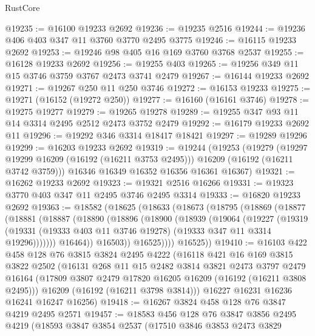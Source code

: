 \begin{lexlean}{RustCore}
\begin{coremodule}
@19235 := @16100 @19233 @2692
@19236 := @19235 @2516
@19244 := @19236 @406 @403 @347 @11 @3760 @3770 @2495 @3775
@19246 := @16115 @19233 @2692
@19253 := @19246 @98 @405 @16 @169 @3760 @3768 @2537
@19255 := @16128 @19233 @2692
@19256 := @19255 @403
@19265 := @19256 @349 @11 @15 @3746 @3759 @3767 @2473 @3741 @2479
@19267 := @16144 @19233 @2692
@19271 := @19267 @250 @11 @250 @3746
@19272 := @16153 @19233
@19275 := @19271 (@16152 (@19272 @250))
@19277 := @16160 (@16161 @3746)
@19278 := @19275 @19277
@19279 := @19265 @19278
@19289 := @19255 @347 @93 @11 @14 @3314 @2495 @2512 @2473 @3752 @2479
@19292 := @16179 @19233 @2692 @11
@19296 := @19292 @346 @3314 @18417 @18421
@19297 := @19289 @19296
@19299 := @16203 @19233 @2692
@19319 := @19244
    (@19253
      (@19279
        (@19297 @19299 @16209 (@16192 (@16211 @3753 @2495)))
        @16209
        (@16192 (@16211 @3742 @3759)))
      @16346
      @16349
      @16352
      @16356
      @16361
      @16367)
@19321 := @16262 @19233 @2692
@19323 := @19321 @2516 @16266
@19331 := @19323 @3770 @403 @347 @11 @2495 @3746 @2495 @3314
@19333 := @16820 @19233 @2692
@19363 := @18582
    (@18625
      (@18633
        (@18673
          (@18795
            (@18869
              (@18877
                (@18881
                  (@18887
                    (@18890
                      (@18896
                        (@18900
                          (@18939
                            (@19064
                              (@19227
                                (@19319
                                  (@19331
                                    (@19333 @403 @11 @3746 @19278)
                                    (@19333 @347 @11 @3314 @19296)))))))
                        @16464))
                    @16503))
                @16525))))
        @16525))
@19410 := @16103
    @422
    @458
    @128
    @76
    @3815
    @3824
    @2495
    @4222
    (@16118
      @421
      @16
      @169
      @3815
      @3822
      @2502
      (@16131
        @268
        @11
        @15
        @2482
        @3814
        @3821
        @2473
        @3797
        @2479
        @16164
        (@17809 @3807 @2479 @17820 @16205 @16209 (@16192 (@16211 @3808 @2495)))
        @16209
        (@16192 (@16211 @3798 @3814)))
      @16227
      @16231
      @16236
      @16241
      @16247
      @16256)
@19418 := @16267 @3824 @458 @128 @76 @3847 @4219 @2495 @2571
@19457 := @18583
    @456
    @128
    @76
    @3847
    @3856
    @2495
    @4219
    (@18593
      @3847
      @3854
      @2537
      (@17510
        @3846
        @3853
        @2473
        @3829

\end{coremodule}
\end{lexlean}
